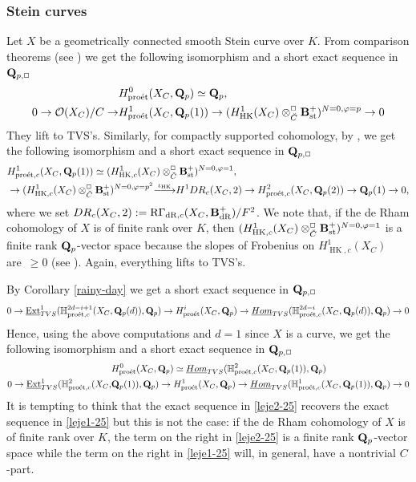 \documentclass[10pt,reqno]{amsart}
\theoremstyle{definition}
\theoremstyle{remark}
\def\lomapr#1{\smash{\mathop{\relbar\joinrel\longrightarrow}\limits^{#1}}}
\def\phi{\varphi}
\newcommand{\dr}{\operatorname{dR} }
\newcommand{\proeet}{\operatorname{pro\acute{e}t} }
\newcommand{\uHom}{\underline{{\rm{Hom}} }}
\newcommand{\Ext}{\operatorname{Ext} }
\newcommand{\st}{\operatorname{st} }
\newcommand{\hk}{\operatorname{HK} }
\newcommand{\so}{{\mathcal O}}
\numberwithin{equation}{section}
\def\R{{\mathrm R}}
\def\Q{{\bf Q}} \def\Z{{\bf Z}}
\numberwithin{equation}{section}
\begin{document}
\subsubsection{Stein curves}
 Let $X$ be a geometrically connected smooth Stein curve over $K$. 
 From comparison theorems (see \cite[Th. 6.14]{CN5}) we get the following isomorphism and a short exact sequence in $\Q_{p,\Box}$
 \begin{align}\label{leje1-25}
 & H^0_{\proeet}(X_C,\Q_p)\simeq \Q_p,\\
 0\to  \so(X_C)/C \to &  H^1_{\proeet}(X_C,\Q_p(1))\to
  (H^1_{\hk}(X_C)\otimes^{\Box}_{\breve{C}}\B^+_{\st})^{N=0,\phi=p}\to  0\notag
 \end{align}
 They lift to {\rm TVS}'s. Similarly, for compactly supported cohomology,  by \cite[Sec.\,7.2]{AGN}, we get the following isomorphism and a short exact sequence in $\Q_{p,\Box}$
 \begin{align*}
 & H^1_{\proeet,c}(X_C,\Q_p(1))\simeq (H^1_{\hk,c}(X_C)\otimes^{\Box}_{\breve{C}}\B^+_{\st})^{N=0,\phi=1},\\
& \to (H^1_{\hk,c}(X_C)\otimes^{\Box}_{\breve{C}}\B^+_{\st})^{N=0,\phi=p^2} \lomapr{\iota_{\hk}} H^1{\rm DR}_c(X_C,2)\to H^2_{\proeet,c}(X_C,\Q_p(2))\to \Q_p(1) \to 0,
 \end{align*}
  where we set ${\rm DR}_c(X_C,2):= \R\Gamma_{\dr,c}(X_C,\B^+_{\dr})/F^2$. We note that, if the de Rham cohomology of $X$ is of finite rank over $K$, then  $(H^1_{\hk,c}(X_C)\otimes^{\Box}_{\breve{C}}\B^+_{\st})^{N=0,\phi=1}$ is a finite rank $\Q_p$-vector space because the slopes of Frobenius
on $H^1_{\hk,c}(X_C)$ are~$\geq 0$ (see \cite[Remark 7.10]{AGN}). 
Again, everything lifts to {\rm TVS}'s. 
  
   By Corollary \ref{rainy-day} we get
   a short exact sequence in $\Q_{p,\Box}$
$$
0\to\underline{\Ext}^1_{\rm TVS}({\mathbb H}^{2d-i+1}_{\proeet,c}(X_C,\Q_p(d)),\Q_p)\to {H}^i_{\proeet}(X_C,\Q_p)\to
\uHom_{\rm TVS}({\mathbb H}^{2d-i}_{\proeet,c}(X_C,\Q_p(d)),\Q_p)\to 0
$$
Hence, using the above computations and $d=1$ since $X$ is a curve, 
we get  the following isomorphism and a short exact sequence in $\Q_{p,\Box}$
\begin{align}\label{leje2-25}
 & H^0_{\proeet}(X_C,\Q_p)\simeq \uHom_{\rm TVS}({\mathbb H}^{2}_{\proeet,c}(X_C,\Q_p(1)),\Q_p)\\
0\to\underline{\Ext}^1_{\rm TVS}({\mathbb H}^{2}_{\proeet,c}(X_C,& \Q_p(1)),\Q_p)\to {H}^1_{\proeet}(X_C,\Q_p)\to\uHom_{\rm TVS}({\mathbb H}^{1}_{\proeet,c}(X_C,\Q_p(1)),\Q_p)\to 0\notag
\end{align}
It is tempting to think that the exact sequence in \eqref{leje2-25} recovers the exact sequence in \eqref{leje1-25} but this is not the case: if the de Rham cohomology of $X$ is of finite rank over $K$, the term on the right in \eqref{leje2-25} is a finite rank $\Q_p$-vector space while the term on the right in \eqref{leje1-25} will, in general, have a nontrivial $C$-part.
\end{document}
